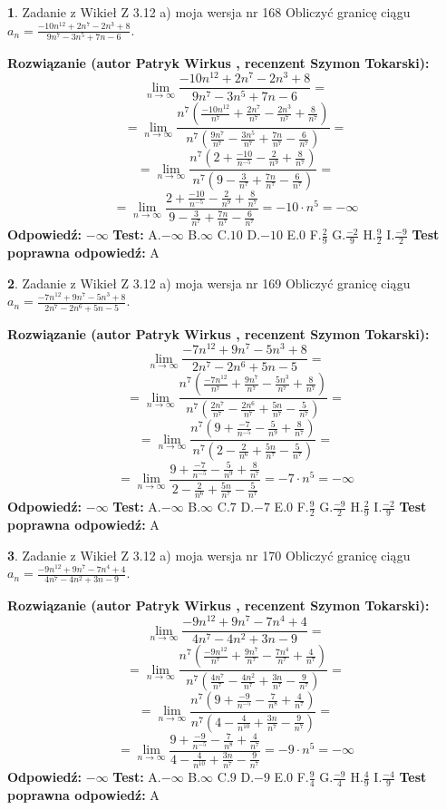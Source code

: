 \documentclass[12pt, a4paper]{article}
\theoremstyle{definition} %
\newtheorem{zad}{}
\newcommand{\zadStart}[1]{\begin{zad}#1\newline}
\newcommand{\zadStop}{\end{zad}}
\newcommand{\rozwStart}[2]{\noindent \textbf{Rozwiązanie (autor #1 , recenzent #2): }\newline}
\newcommand{\rozwStop}{\newline}
\newcommand{\odpStart}{\noindent \textbf{Odpowiedź:}\newline}
\newcommand{\odpStop}{\newline}
\newcommand{\testStart}{\noindent \textbf{Test:}\newline}
\newcommand{\testStop}{\newline}
\newcommand{\kluczStart}{\noindent \textbf{Test poprawna odpowiedź:}\newline}
\newcommand{\kluczStop}{\newline}
\begin{document}
\zadStart{Zadanie z Wikieł Z 3.12 a) moja wersja nr 168}
Obliczyć granicę ciągu $a_{n}=\frac{-10n^{12}+2n^{7}-2n^{3}+8}{9n^{7}-3n^{5}+7n-6}$.
\zadStop
\rozwStart{Patryk Wirkus}{Szymon Tokarski}
$$\lim\limits_{n\to\infty}\frac{-10n^{12}+2n^{7}-2n^{3}+8}{9n^{7}-3n^{5}+7n-6}=$$
$$=\lim\limits_{n\to\infty}\frac{n^{7}\left(\frac{-10n^{12}}{n^{7}}+\frac{2n^{7}}{n^{7}}-\frac{2n^{3}}{n^{7}}+\frac{8}{n^{7}}\right)}{n^{7}\left(\frac{9n^{7}}{n^{7}}-\frac{3n^{5}}{n^{7}}+\frac{7n}{n^{7}}-\frac{6}{n^{7}}\right)}=$$
$$=\lim\limits_{n\to\infty}\frac{n^{7}\left(2+\frac{-10}{n^{-5}}-\frac{2}{n^{9}}+\frac{8}{n^{7}}\right)}
{n^{7}\left(9-\frac{3}{n^{7}}+\frac{7n}{n^{7}}-\frac{6}{n^{7}}\right)}=$$
$$=\lim\limits_{n\to\infty}\frac{2+\frac{-10}{n^{-5}}-\frac{2}{n^{9}}+\frac{8}{n^{7}}}{9-\frac{3}{n^{7}}+\frac{7n}{n^{7}}-\frac{6}{n^{7}}}=-10\cdot n^{5} = -\infty$$
\rozwStop
\odpStart
$-\infty$
\odpStop
\testStart
A.$-\infty$
B.$\infty$
C.$10$
D.$-10$
E.$0$
F.$\frac{2}{9}$
G.$\frac{-2}{9}$
H.$\frac{9}{2}$
I.$\frac{-9}{2}$
\testStop
\kluczStart
A
\kluczStop



\zadStart{Zadanie z Wikieł Z 3.12 a) moja wersja nr 169}
Obliczyć granicę ciągu $a_{n}=\frac{-7n^{12}+9n^{7}-5n^{3}+8}{2n^{7}-2n^{6}+5n-5}$.
\zadStop
\rozwStart{Patryk Wirkus}{Szymon Tokarski}
$$\lim\limits_{n\to\infty}\frac{-7n^{12}+9n^{7}-5n^{3}+8}{2n^{7}-2n^{6}+5n-5}=$$
$$=\lim\limits_{n\to\infty}\frac{n^{7}\left(\frac{-7n^{12}}{n^{7}}+\frac{9n^{7}}{n^{7}}-\frac{5n^{3}}{n^{7}}+\frac{8}{n^{7}}\right)}{n^{7}\left(\frac{2n^{7}}{n^{7}}-\frac{2n^{6}}{n^{7}}+\frac{5n}{n^{7}}-\frac{5}{n^{7}}\right)}=$$
$$=\lim\limits_{n\to\infty}\frac{n^{7}\left(9+\frac{-7}{n^{-5}}-\frac{5}{n^{9}}+\frac{8}{n^{7}}\right)}
{n^{7}\left(2-\frac{2}{n^{6}}+\frac{5n}{n^{7}}-\frac{5}{n^{7}}\right)}=$$
$$=\lim\limits_{n\to\infty}\frac{9+\frac{-7}{n^{-5}}-\frac{5}{n^{9}}+\frac{8}{n^{7}}}{2-\frac{2}{n^{6}}+\frac{5n}{n^{7}}-\frac{5}{n^{7}}}=-7\cdot n^{5} = -\infty$$
\rozwStop
\odpStart
$-\infty$
\odpStop
\testStart
A.$-\infty$
B.$\infty$
C.$7$
D.$-7$
E.$0$
F.$\frac{9}{2}$
G.$\frac{-9}{2}$
H.$\frac{2}{9}$
I.$\frac{-2}{9}$
\testStop
\kluczStart
A
\kluczStop



\zadStart{Zadanie z Wikieł Z 3.12 a) moja wersja nr 170}
Obliczyć granicę ciągu $a_{n}=\frac{-9n^{12}+9n^{7}-7n^{4}+4}{4n^{7}-4n^{2}+3n-9}$.
\zadStop
\rozwStart{Patryk Wirkus}{Szymon Tokarski}
$$\lim\limits_{n\to\infty}\frac{-9n^{12}+9n^{7}-7n^{4}+4}{4n^{7}-4n^{2}+3n-9}=$$
$$=\lim\limits_{n\to\infty}\frac{n^{7}\left(\frac{-9n^{12}}{n^{7}}+\frac{9n^{7}}{n^{7}}-\frac{7n^{4}}{n^{7}}+\frac{4}{n^{7}}\right)}{n^{7}\left(\frac{4n^{7}}{n^{7}}-\frac{4n^{2}}{n^{7}}+\frac{3n}{n^{7}}-\frac{9}{n^{7}}\right)}=$$
$$=\lim\limits_{n\to\infty}\frac{n^{7}\left(9+\frac{-9}{n^{-5}}-\frac{7}{n^{8}}+\frac{4}{n^{7}}\right)}
{n^{7}\left(4-\frac{4}{n^{10}}+\frac{3n}{n^{7}}-\frac{9}{n^{7}}\right)}=$$
$$=\lim\limits_{n\to\infty}\frac{9+\frac{-9}{n^{-5}}-\frac{7}{n^{8}}+\frac{4}{n^{7}}}{4-\frac{4}{n^{10}}+\frac{3n}{n^{7}}-\frac{9}{n^{7}}}=-9\cdot n^{5} = -\infty$$
\rozwStop
\odpStart
$-\infty$
\odpStop
\testStart
A.$-\infty$
B.$\infty$
C.$9$
D.$-9$
E.$0$
F.$\frac{9}{4}$
G.$\frac{-9}{4}$
H.$\frac{4}{9}$
I.$\frac{-4}{9}$
\testStop
\kluczStart
A
\kluczStop
\end{document}

